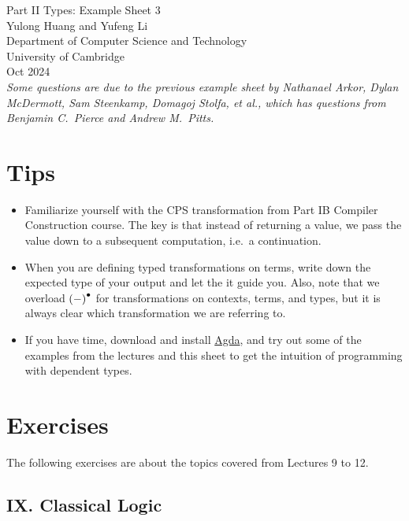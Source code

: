 \documentclass[11pt,a4paper,twoside]{article}
\begin{document}
\begin{center}
{\Huge Part II Types: Example Sheet 3}\\
\vspace{1.0em}
{\large Yulong Huang and Yufeng Li}\\
\vspace{0.5em}
{\small Department of Computer Science and Technology \\ University of Cambridge \\ Oct 2024}\\
\vspace{1.0em}
\small{\textit{Some questions are due to the previous example sheet by Nathanael Arkor, Dylan McDermott, Sam Steenkamp, Domagoj Stolfa, et al., which has questions from Benjamin C.~Pierce and Andrew M.~Pitts.}}
\end{center}

\section*{Tips}

\begin{itemize}
\item Familiarize yourself with the CPS transformation from Part IB Compiler Construction course. 
The key is that instead of returning a value, 
we pass the value down to a subsequent computation, i.e.~a continuation.

\item When you are defining typed transformations on terms, write down the expected type of your output
and let the it guide you.
Also, note that we overload ${(-)}^{\bullet}$ for transformations on contexts, terms, and types,
but it is always clear which transformation we are referring to.

\item If you have time, download and install 
\href{https://agda.readthedocs.io/en/latest/getting-started/installation.html}{Agda},
and try out some of the examples from the lectures and this sheet
to get the intuition of programming with dependent types.
\end{itemize}

\section*{Exercises}

The following exercises are about the topics covered from Lectures 9 to 12.

\subsection*{IX. Classical Logic}
\end{document}
